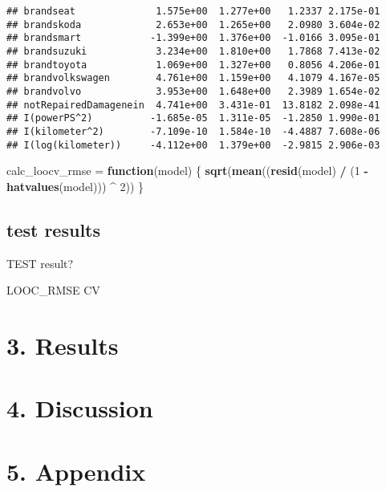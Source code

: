 \documentclass[]{article}
\newenvironment{Shaded}{\begin{snugshade}}{\end{snugshade}}
\newcommand{\ControlFlowTok}[1]{\textcolor[rgb]{0.13,0.29,0.53}{\textbf{#1}}}
\newcommand{\DecValTok}[1]{\textcolor[rgb]{0.00,0.00,0.81}{#1}}
\newcommand{\KeywordTok}[1]{\textcolor[rgb]{0.13,0.29,0.53}{\textbf{#1}}}
\newcommand{\NormalTok}[1]{#1}
\newcommand{\OperatorTok}[1]{\textcolor[rgb]{0.81,0.36,0.00}{\textbf{#1}}}
\newcommand{\StringTok}[1]{\textcolor[rgb]{0.31,0.60,0.02}{#1}}
\begin{document}
\begin{verbatim}
## brandseat              1.575e+00  1.277e+00   1.2337 2.175e-01
## brandskoda             2.653e+00  1.265e+00   2.0980 3.604e-02
## brandsmart            -1.399e+00  1.376e+00  -1.0166 3.095e-01
## brandsuzuki            3.234e+00  1.810e+00   1.7868 7.413e-02
## brandtoyota            1.069e+00  1.327e+00   0.8056 4.206e-01
## brandvolkswagen        4.761e+00  1.159e+00   4.1079 4.167e-05
## brandvolvo             3.953e+00  1.648e+00   2.3989 1.654e-02
## notRepairedDamagenein  4.741e+00  3.431e-01  13.8182 2.098e-41
## I(powerPS^2)          -1.685e-05  1.311e-05  -1.2850 1.990e-01
## I(kilometer^2)        -7.109e-10  1.584e-10  -4.4887 7.608e-06
## I(log(kilometer))     -4.112e+00  1.379e+00  -2.9815 2.906e-03
\end{verbatim}

\begin{Shaded}
\begin{Highlighting}[]
\NormalTok{calc_loocv_rmse =}\StringTok{ }\ControlFlowTok{function}\NormalTok{(model) \{}
  \KeywordTok{sqrt}\NormalTok{(}\KeywordTok{mean}\NormalTok{((}\KeywordTok{resid}\NormalTok{(model) }\OperatorTok{/}\StringTok{ }\NormalTok{(}\DecValTok{1} \OperatorTok{-}\StringTok{ }\KeywordTok{hatvalues}\NormalTok{(model))) }\OperatorTok{^}\StringTok{ }\DecValTok{2}\NormalTok{))}
\NormalTok{\}}
\end{Highlighting}
\end{Shaded}

\hypertarget{test-results}{%
\subsection{test results}\label{test-results}}

TEST result?

LOOC\_RMSE CV

\hypertarget{results}{%
\section{3. Results}\label{results}}

\hypertarget{discussion}{%
\section{4. Discussion}\label{discussion}}

\hypertarget{appendix}{%
\section{5. Appendix}\label{appendix}}
\end{document}
